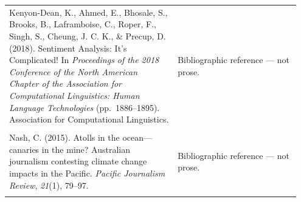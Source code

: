 \documentclass[11pt]{article}
\begin{document}
\begin{longtable}{|p{0.55\linewidth}|p{0.40\linewidth}|}
\hline
\rule{0pt}{3.5cm} & \\
\hline
Kenyon-Dean, K., Ahmed, E., Bhosale, S., Brooks, B., Laframboise, C., Roper, F., Singh, S., Cheung, J. C. K., \& Precup, D. (2018). Sentiment Analysis: It's Complicated! In \textit{Proceedings of the 2018 Conference of the North American Chapter of the Association for Computational Linguistics: Human Language Technologies} (pp.\ 1886--1895). Association for Computational Linguistics. & Bibliographic reference --- not prose. \\[2pt]
\hline
\rule{0pt}{3.5cm} & \\
\hline
Nash, C. (2015). Atolls in the ocean---canaries in the mine? Australian journalism contesting climate change impacts in the Pacific. \textit{Pacific Journalism Review}, \textit{21}(1), 79--97. & Bibliographic reference --- not prose. \\[2pt]
\hline
\rule{0pt}{3.5cm} & \\
\hline
\end{longtable}
\end{document}
